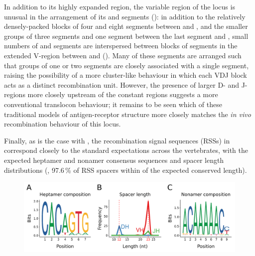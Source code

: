 In addition to its highly expanded \vh region, the variable region of the \Xma locus is unusual in the arrangement of its \dh and \jh segments (): in addition to the relatively densely-packed blocks of four \dh and eight \jh segments between  and , and the smaller groups of three \dh segments and one \jh segment between the last \vh segment and , small numbers of \dh and \jh segments are interspersed between blocks of \vh segments in the extended V-region between  and  (). Many of these segments are arranged such that groups of one or two \dh segments are closely associated with a single \jh segment, raising the possibility of a more cluster-like behaviour in which each VDJ block acts as a distinct recombination unit. However, the presence of larger D- and J-regions more closely upstream of the constant regions suggests a more conventional translocon behaviour; it remains to be seen which of these traditional models of antigen-receptor structure more closely matches the \textit{in vivo} recombination behaviour of this locus.
		
Finally, as is the case with \Nfu, the recombination signal sequences (RSSs) in \Xma \igh{} correspond closely to the standard expectations across the vertebrates, with the expected heptamer and nonamer consensus sequences and spacer length distributions (, 97.6\,\% of RSS spacers within  of the expected conserved length).	

	\begin{figure}
		\begin{subfigure}{0em}
        \label{fig:xma-rss-seqlogo-all-heptamer}
    \end{subfigure}
    \begin{subfigure}{0em}
        \label{fig:xma-rss-seqlogo-all-spacer}
    \end{subfigure}
    \begin{subfigure}{0em}
        \label{fig:xma-rss-seqlogo-all-nonamer}
    \end{subfigure}
	\includegraphics[width=\textwidth]{_Figures/png/xma-new-rss-seqlogo-all}
	\label{fig:xma-rss-seqlogo-all}
	\vspace{1em}
	\end{figure}
	
